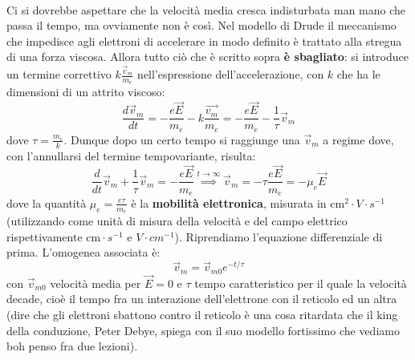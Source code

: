 \documentclass{book}
\begin{document}
         \paragraph{}
            Ci si dovrebbe aspettare che la velocità media cresca indisturbata man mano che passa il tempo, ma ovviamente non è così. Nel modello di Drude il meccanismo che impedisce agli elettroni di accelerare in modo definito è trattato alla stregua di una forza viscosa. Allora tutto ciò che è scritto sopra \textbf{è sbagliato}: si introduce un termine correttivo $\displaystyle k\frac{\vec{v}_{m}}{m_{e}}$ nell'espressione dell'accelerazione, con $k$ che ha le dimensioni di un attrito viscoso:
            $$\frac{d\vec{v}_{m}}{dt} = - \frac{e\vec{E}}{m_{e}} - k \frac{\vec{v_{m}}}{m_{e}} = -\frac{e\vec{E}}{m_{e}}-\frac{1}{\tau}\vec{v}_{m}$$
            dove $\displaystyle \tau = \frac{m_{e}}{k}$. Dunque dopo un certo tempo si raggiunge una $\vec{v}_{m}$ a regime dove, con l'annullarsi del termine tempovariante, risulta:
            $$\frac{d}{dt}\vec{v}_{m} + \frac{1}{\tau} \vec{v}_{m} = - \frac{e\vec{E}}{m_{e}} \stackrel{t \to \infty}{\implies} \vec{v}_{m} = - \tau\frac{e\vec{E}}{m_{e}} = - \mu_{e} \vec{E}$$
            dove la quantità $\displaystyle \mu_{e} = \frac{e \tau}{m_{e}}$ è la \textbf{mobilità elettronica}, misurata in $\textrm{cm}^{2}\cdot V \cdot s^{-1}$ (utilizzando come unità di misura della velocità e del campo elettrico rispettivamente $\textrm{cm} \cdot s^{-1}$ e $V \cdot cm^{-1}$).
            Riprendiamo l'equazione differenziale di prima. L'omogenea associata è:
            $$\vec{v}_{m} = \vec{v}_{m0} e^{-t/\tau}$$
            con $\vec{v}_{m0}$ velocità media per $\vec{E} =0$ e $\tau$ tempo caratteristico per il quale la velocità decade, cioè il tempo fra un interazione dell'elettrone con il reticolo ed un altra (dire che gli elettroni sbattono contro il reticolo è una cosa ritardata che il king della conduzione, Peter Debye, spiega con il suo modello fortissimo che vediamo boh penso fra due lezioni).
\end{document}

